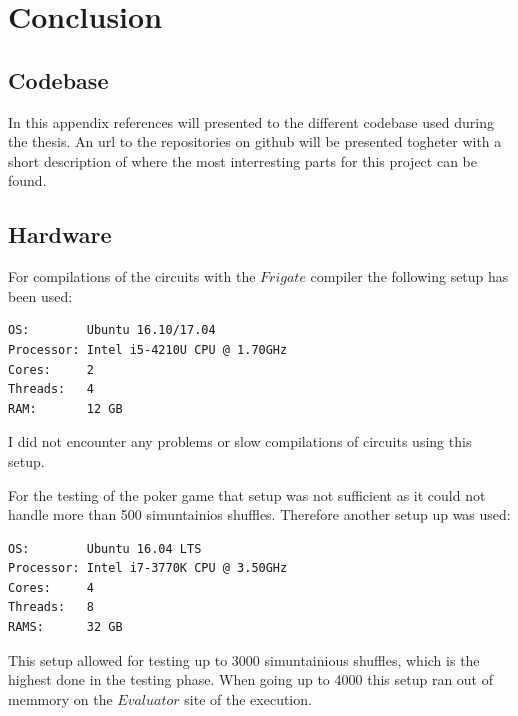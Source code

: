 \documentclass[twoside,11pt,openright]{report}
\begin{document}

\chapter{Conclusion}
\label{ch:conclusion}



\begin{appendices}
\chapter{Codebase}
In this appendix references will presented to the different codebase used during the thesis. An url to the repositories on github will be presented togheter with a short description of where the most interresting parts for this project can be found.

\section{Hardware}
\label{app:hardware}
For compilations of the circuits with the $Frigate$ compiler the following setup has been used:

\begin{center}
\begin{verbatim}
OS:        Ubuntu 16.10/17.04
Processor: Intel i5-4210U CPU @ 1.70GHz
Cores:     2
Threads:   4
RAM:       12 GB
\end{verbatim}
\end{center}

I did not encounter any problems or slow compilations of circuits using this setup.

\bigskip
For the testing of the poker game that setup was not sufficient as it could not handle more than 500 simuntainios shuffles. Therefore another setup up was used:

\begin{center}
\begin{verbatim}
OS:        Ubuntu 16.04 LTS
Processor: Intel i7-3770K CPU @ 3.50GHz
Cores:     4
Threads:   8
RAMS:      32 GB
\end{verbatim}
\end{center}

This setup allowed for testing up to 3000 simuntainious shuffles, which is the highest done in the testing phase. When going up to 4000 this setup ran out of memmory on the $Evaluator$ site of the execution.



\end{appendices}
\end{document}
